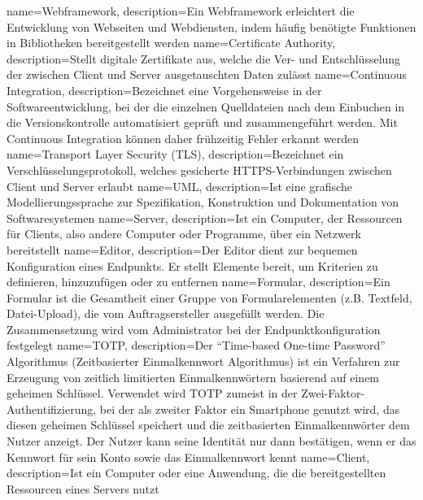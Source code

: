 {
	name=Webframework,
	description={Ein Webframework erleichtert die Entwicklung von Webseiten und Webdiensten, indem häufig benötigte Funktionen in Bibliotheken bereitgestellt werden}
}
{
	name=Certificate Authority,
	description={Stellt digitale Zertifikate aus, welche die Ver- und Entschlüsselung der zwischen Client und Server ausgetauschten Daten zulässt}
}
{
	name=Continuous Integration,
	description={Bezeichnet eine Vorgehensweise in der Softwareentwicklung, bei der die einzelnen Quelldateien nach dem Einbuchen in die Versionskontrolle automatisiert geprüft und zusammengeführt werden. Mit Continuous Integration können daher frühzeitig Fehler erkannt werden}
}
{
	name=Transport Layer Security (TLS),
	description={Bezeichnet ein Verschlüsselungsprotokoll, welches gesicherte HTTPS-Verbindungen zwischen Client und Server erlaubt}
}
{
	name=UML,
	description={Ist eine grafische Modellierungssprache zur Spezifikation, Konstruktion und Dokumentation von Softwaresystemen}
}
{
	name=Server,
	description={Ist ein Computer, der Ressourcen für Clients, also andere Computer oder Programme, über ein Netzwerk bereitstellt}
}
{
	name=Editor,
	description={Der Editor dient zur bequemen Konfiguration eines Endpunkts. Er stellt Elemente bereit, um Kriterien zu definieren, hinzuzufügen oder zu entfernen}
}
{
	name=Formular,
	description={Ein Formular ist die Gesamtheit einer Gruppe von Formularelementen (z.B. Textfeld, Datei-Upload), die vom Auftragsersteller ausgefüllt werden. Die Zusammensetzung wird vom Administrator bei der Endpunktkonfiguration festgelegt}
}
{
	name=TOTP,
	description={Der \enquote{Time-based One-time Password} Algorithmus (Zeitbasierter Einmalkennwort Algorithmus) ist ein Verfahren zur Erzeugung von zeitlich limitierten Einmalkennwörtern basierend auf einem geheimen Schlüssel. Verwendet wird TOTP zumeist in der Zwei-Faktor-Authentifizierung, bei der als zweiter Faktor ein Smartphone genutzt wird, das diesen geheimen Schlüssel speichert und die zeitbasierten Einmalkennwörter dem Nutzer anzeigt. Der Nutzer kann seine Identität nur dann bestätigen, wenn er das Kennwort für sein Konto sowie das Einmalkennwort kennt}
}
{
	name=Client,
	description={Ist ein Computer oder eine Anwendung, die die bereitgestellten Ressourcen eines Servers nutzt}
}
